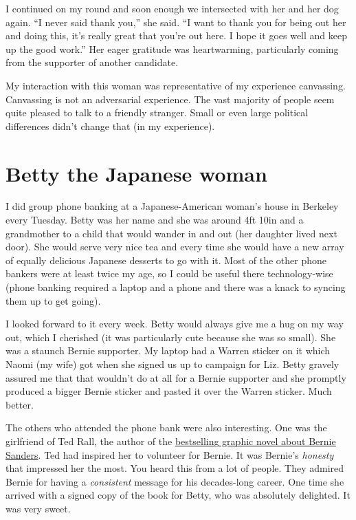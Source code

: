 \documentclass[]{book}
\begin{document}
I continued on my round and soon enough we intersected with her and her dog again. ``I never said thank you,'' she said. ``I want to thank you for being out her and doing this, it's really great that you're out here. I hope it goes well and keep up the good work.'' Her eager gratitude was heartwarming, particularly coming from the supporter of another candidate.

My interaction with this woman was representative of my experience canvassing. Canvassing is not an adversarial experience. The vast majority of people seem quite pleased to talk to a friendly stranger. Small or even large political differences didn't change that (in my experience).

\hypertarget{betty-the-japanese-woman}{%
\section{Betty the Japanese woman}\label{betty-the-japanese-woman}}

I did group phone banking at a Japanese-American woman's house in Berkeley every Tuesday. Betty was her name and she was around 4ft 10in and a grandmother to a child that would wander in and out (her daughter lived next door). She would serve very nice tea and every time she would have a new array of equally delicious Japanese desserts to go with it. Most of the other phone bankers were at least twice my age, so I could be useful there technology-wise (phone banking required a laptop and a phone and there was a knack to syncing them up to get going).

I looked forward to it every week. Betty would always give me a hug on my way out, which I cherished (it was particularly cute because she was so small). She was a staunch Bernie supporter. My laptop had a Warren sticker on it which Naomi (my wife) got when she signed us up to campaign for Liz. Betty gravely assured me that that wouldn't do at all for a Bernie supporter and she promptly produced a bigger Bernie sticker and pasted it over the Warren sticker. Much better.

The others who attended the phone bank were also interesting. One was the girlfriend of Ted Rall, the author of the \href{https://www.penguinrandomhouse.com/books/536904/bernie-by-ted-rall/}{bestselling graphic novel about Bernie Sanders}. Ted had inspired her to volunteer for Bernie. It was Bernie's \emph{honesty} that impressed her the most. You heard this from a lot of people. They admired Bernie for having a \emph{consistent} message for his decades-long career. One time she arrived with a signed copy of the book for Betty, who was absolutely delighted. It was very sweet.
\end{document}
